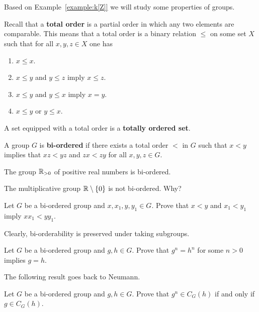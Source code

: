 \chapter{}


Based on Example~\ref{example:k[Z]} we will study 
some properties of groups. 

Recall that a \textbf{total order} is a partial order in which any two elements are comparable. This
means that a total order is a binary relation $\leq$ on some set $X$ 
such that for all $x,y,z\in X$ one has 
\begin{enumerate}
    \item $x\leq x$.
    \item $x\leq y$ and $y\leq z$ imply $x\leq z$.
    \item $x\leq y$ and $y\leq x$ imply $x=y$.
    \item $x\leq y$ or $y\leq x$. 
\end{enumerate}
A set equipped with a total order is a \textbf{totally ordered set}. 

\begin{definition}
	A group $G$ is \textbf{bi-ordered} if there exists a total order 
	$<$ in $G$
	such that $x<y$ implies that $xz<yz$ and $zx<zy$ for all $x,y,z\in G$.
\end{definition}

\begin{example}
	The group $\mathbb{R}_{>0}$ of positive real numbers is bi-ordered. 
\end{example}

The multiplicative group $\mathbb{R}\setminus\{0\}$ is not bi-ordered. Why?

\begin{exercise}
	Let $G$ be a bi-ordered group and $x,x_1,y,y_1\in G$. Prove that
	$x<y$ and $x_1<y_1$ imply $xx_1<yy_1$.
\end{exercise}

Clearly, bi-orderability is preserved under taking subgroups. 

\begin{exercise}
	Let $G$ be a bi-ordered group and $g,h\in G$. Prove that $g^n=h^n$
	for some $n>0$ implies $g=h$.
\end{exercise}

The following result goes back to Neumann.

\begin{exercise}
    Let $G$ be a bi-ordered group and $g,h\in G$. Prove that $g^n\in C_G(h)$ if 
    and only if $g\in C_G(h)$.
\end{exercise}

